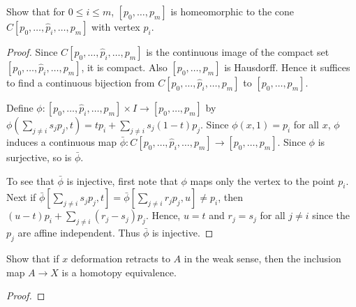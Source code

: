 \documentclass{article}
\begin{document}
 Show that for $0 \le i \le m$, $[p_0, \ldots, p_m]$ is homeomorphic to the cone
$C[p_0, \ldots, \hat p_i, \ldots, p_m]$ with vertex $p_i$.
\begin{proof}
Since $C[p_0, \ldots, \hat p_i, \ldots, p_m]$ is the continuous image of the compact set
$[p_0, \ldots, \hat p_i, \ldots, p_m]$, it is compact.  Also $[p_0, \ldots, p_m]$ is Hausdorff.
Hence it suffices to find a continuous bijection from $C[p_0, \ldots, \hat p_i, \ldots, p_m]$
to $[p_0, \ldots,  p_m]$.

Define $\phi: [p_0, \ldots, \hat p_i, \ldots, p_m] \times I \to [p_0, \ldots,  p_m]$ by
$\phi( \sum_{j \neq i} s_j p_j, t) = t p_i + \sum_{j \neq i} s_j (1-t) p_j$.
Since $\phi(x, 1) = p_i$ for all $x$, $\phi$ induces a continuous map 
$\bar \phi : C[p_0, \ldots, \hat p_i, \ldots, p_m] \to [p_0, \ldots,  p_m]$. Since $\phi$ is surjective, so is $\bar \phi$.

To see that $\bar \phi$ is injective, first note that $\phi$ maps only the vertex to the point $p_i$. Next if
$\bar \phi [\sum_{j \neq i} s_j p_j, t]  = \bar \phi [\sum_{j \neq i} r_j p_j, u] \neq p_i$, then
$(u-t) p_i + \sum_{j \neq i} (r_j - s_j) p_j$.  Hence, $u = t$ and $r_j = s_j$ for all $j \neq i$ since
the $p_j$ are affine independent.  Thus $\bar \phi$ is injective.
\end{proof}

  Show that if $x$ deformation retracts to $A$ in the weak sense, then the
inclusion map $A \to X$ is a homotopy equivalence.
\begin{proof}

\end{proof}
\end{document}
